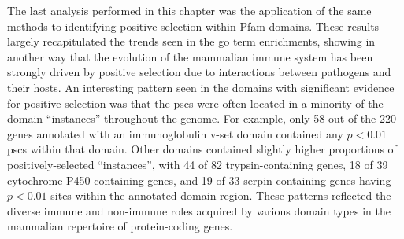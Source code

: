 The last analysis performed in this chapter was the application of the
same \sw methods to identifying positive selection within Pfam
domains. These results largely recapitulated the trends seen in the
\ac{go} term enrichments, showing in another way that the evolution of
the mammalian immune system has been strongly driven by positive
selection due to interactions between pathogens and their hosts. An
interesting pattern seen in the domains with significant evidence for
positive selection was that the \acp{psc} were often located in a
minority of the domain ``instances'' throughout the genome. For
example, only 58 out of the 220 genes annotated with an immunoglobulin
v-set domain contained any $p<0.01$ \acp{psc} within that
domain. Other domains contained slightly higher proportions of
positively-selected ``instances'', with 44 of 82 trypsin-containing
genes, 18 of 39 cytochrome P450-containing genes, and 19 of 33
serpin-containing genes having $p<0.01$ sites within the annotated
domain region. These patterns reflected the diverse immune and
non-immune roles acquired by various domain types in the mammalian
repertoire of protein-coding genes.
